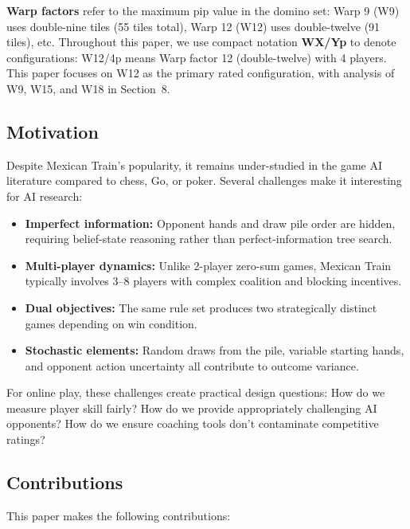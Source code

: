 \documentclass[11pt,letterpaper]{article}
\begin{document}
\textbf{Warp factors} refer to the maximum pip value in the domino set: Warp 9 (W9) uses double-nine tiles (55 tiles total), Warp 12 (W12) uses double-twelve (91 tiles), etc. Throughout this paper, we use compact notation \textbf{WX/Yp} to denote configurations: W12/4p means Warp factor 12 (double-twelve) with 4 players. This paper focuses on W12 as the primary rated configuration, with analysis of W9, W15, and W18 in Section~8.

\subsection{Motivation}

Despite Mexican Train's popularity, it remains under-studied in the game AI literature compared to chess, Go, or poker. Several challenges make it interesting for AI research:

\begin{itemize}
\item \textbf{Imperfect information:} Opponent hands and draw pile order are hidden, requiring belief-state reasoning rather than perfect-information tree search.
\item \textbf{Multi-player dynamics:} Unlike 2-player zero-sum games, Mexican Train typically involves 3--8 players with complex coalition and blocking incentives.
\item \textbf{Dual objectives:} The same rule set produces two strategically distinct games depending on win condition.
\item \textbf{Stochastic elements:} Random draws from the pile, variable starting hands, and opponent action uncertainty all contribute to outcome variance.
\end{itemize}

For online play, these challenges create practical design questions: How do we measure player skill fairly? How do we provide appropriately challenging AI opponents? How do we ensure coaching tools don't contaminate competitive ratings?

\subsection{Contributions}

This paper makes the following contributions:
\end{document}
